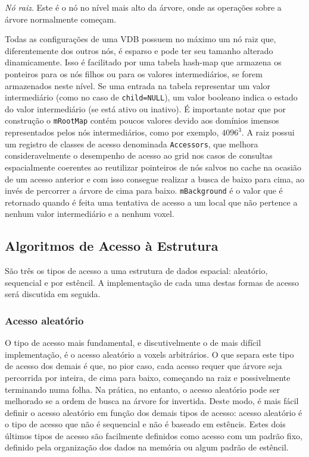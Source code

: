 \documentclass[12pt, a4paper, oneside]{book}
\begin{document}
\emph{Nó raiz}. Este é o nó no nível mais alto da árvore, onde as operações sobre a árvore normalmente começam. 



Todas as configurações de uma VDB possuem no máximo um nó raiz que, diferentemente dos outros nós, é esparso e pode ter seu tamanho alterado dinamicamente. Isso é facilitado por uma tabela hash-map que armazena os ponteiros para os nós filhos ou para os valores intermediários, se forem armazenados neste nível. Se uma entrada na tabela representar um valor intermediário (como no caso de \texttt{child=NULL}), um valor booleano indica o estado do valor intermediário (se está ativo ou inativo). É importante notar que por construção o \texttt{mRootMap} contém poucos valores devido aos domínios imensos representados pelos nós intermediários, como por exemplo, $4096^{3}$.
A raiz possui um registro de classes de acesso denominada \texttt{Accessors}, que melhora consideravelmente o desempenho de acesso ao grid nos casos de consultas espacialmente coerentes ao reutilizar pointeiros de nós salvos no cache na ocasião de um acesso anterior e com isso consegue realizar a busca de baixo para cima, ao invés de percorrer a árvore de cima para baixo. \texttt{mBackground} é o valor que é retornado quando é feita uma tentativa de acesso a um local que não pertence a nenhum valor intermediário e a nenhum voxel.

\subsection{Algoritmos de Acesso à Estrutura}
São três os tipos de acesso a uma estrutura de dados espacial: aleatório, sequencial e por estêncil. A implementação de cada uma destas formas de acesso será discutida em seguida.

\subsubsection{Acesso aleatório}
O tipo de acesso mais fundamental, e discutivelmente o de mais difícil implementação, é o acesso aleatório a voxels arbitrários. O que separa este tipo de acesso dos demais é que, no pior caso, cada acesso requer que árvore seja percorrida por inteira, de cima para baixo, começando na raiz e possivelmente terminando numa folha. Na prática, no entanto, o acesso aleatório pode ser melhorado se a ordem de busca na árvore for invertida. Deste modo, é mais fácil definir o acesso aleatório em função dos demais tipos de acesso: acesso aleatório é o tipo de acesso que não é sequencial e não é baseado em estêncis. Estes dois últimos tipos de acesso são facilmente definidos como acesso com um padrão fixo, definido pela organização dos dados na memória ou algum padrão de estêncil. \\
\end{document}
